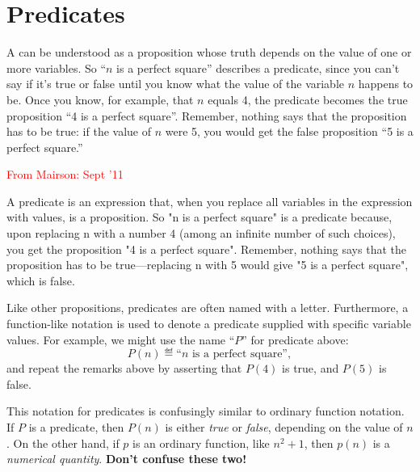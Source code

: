 \section{Predicates}

A  can be understood as a proposition whose truth
depends on the value of one or more variables.  So ``$n$ is a perfect
square'' describes a predicate, since you can't say if it's true or
false until you know what the value of the variable $n$ happens to be.
Once you know, for example, that $n$ equals 4, the predicate becomes
the true proposition ``4 is a perfect square''.  Remember, nothing says
that the proposition has to be true: if the value of $n$ were 5, you
would get the false proposition ``5 is a perfect square.''


\begin{editingnotes}
\textcolor{red}{From Mairson: Sept '11}

A predicate is an expression that, when you replace all variables in
the expression with values, is a proposition.  So "n is a perfect
square" is a predicate because, upon replacing n with a number 4
(among an infinite number of such choices), you get the proposition "4
is a perfect square".  Remember, nothing says that the proposition has
to be true---replacing n with 5 would give "5 is a perfect square",
which is false.
\end{editingnotes}

\iffalse
Most of the propositions above were defined in terms of predicates.
For example,
%
\begin{center}
``$n$ is a perfect square''
\end{center}
%
is a predicate whose truth depends on the value of $n$.  The predicate is
true for $n = 4$ since four is a perfect square, but false for $n = 5$
since five is not a perfect square.  
\fi

Like other propositions, predicates are often named with a letter.
Furthermore, a function-like notation is used to denote a predicate
supplied with specific variable values.  For example, we might use the
name ``$P$'' for predicate above:
\[
P(n) \eqdef \text{``$n$ is a perfect square''},
\]
and repeat the remarks above by asserting that $P(4)$ is true, and
$P(5)$ is false.

This notation for predicates is confusingly similar to ordinary function
notation.  If $P$ is a predicate, then $P(n)$ is either \textit{true} or
\textit{false}, depending on the value of $n$.  On the other hand, if $p$
is an ordinary function, like $n^2 + 1$, then $p(n)$ is a
\textit{numerical quantity}.  \textbf{Don't confuse these two!}

